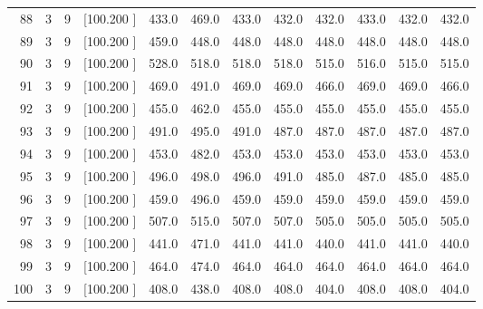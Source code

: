 \documentclass[12pt,a4paper]{article}
\begin{document}
\begin{center}
{\begin{tabular}{r r r r r r r r r r r r}
  88&  3&  9&[100.200   ]&   433.0&   469.0&   433.0&   432.0&   432.0&   433.0&   432.0&   432.0\\[-0.02in]
  89&  3&  9&[100.200   ]&   459.0&   448.0&   448.0&   448.0&   448.0&   448.0&   448.0&   448.0\\[-0.02in]
  90&  3&  9&[100.200   ]&   528.0&   518.0&   518.0&   518.0&   515.0&   516.0&   515.0&   515.0\\[-0.02in]
  91&  3&  9&[100.200   ]&   469.0&   491.0&   469.0&   469.0&   466.0&   469.0&   469.0&   466.0\\[-0.02in]
  92&  3&  9&[100.200   ]&   455.0&   462.0&   455.0&   455.0&   455.0&   455.0&   455.0&   455.0\\[-0.02in]
  93&  3&  9&[100.200   ]&   491.0&   495.0&   491.0&   487.0&   487.0&   487.0&   487.0&   487.0\\[-0.02in]
  94&  3&  9&[100.200   ]&   453.0&   482.0&   453.0&   453.0&   453.0&   453.0&   453.0&   453.0\\[-0.02in]
  95&  3&  9&[100.200   ]&   496.0&   498.0&   496.0&   491.0&   485.0&   487.0&   485.0&   485.0\\[-0.02in]
  96&  3&  9&[100.200   ]&   459.0&   496.0&   459.0&   459.0&   459.0&   459.0&   459.0&   459.0\\[-0.02in]
  97&  3&  9&[100.200   ]&   507.0&   515.0&   507.0&   507.0&   505.0&   505.0&   505.0&   505.0\\[-0.02in]
  98&  3&  9&[100.200   ]&   441.0&   471.0&   441.0&   441.0&   440.0&   441.0&   441.0&   440.0\\[-0.02in]
  99&  3&  9&[100.200   ]&   464.0&   474.0&   464.0&   464.0&   464.0&   464.0&   464.0&   464.0\\[-0.02in]
 100&  3&  9&[100.200   ]&   408.0&   438.0&   408.0&   408.0&   404.0&   408.0&   408.0&   404.0\\[-0.02in]

\hline
\end{tabular}}
\end{center}
\end{document}
